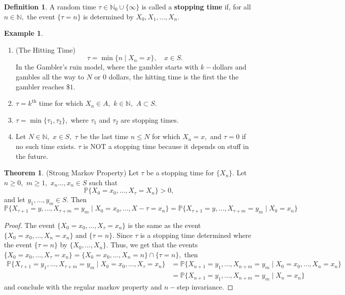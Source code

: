 \documentclass[10pt, oneside]{article}
\newcommand{\bbP}{\mathbb{P}}
\newcommand{\bbN}{\mathbb{N}}
\theoremstyle{definition}
\newtheorem{exmp}{Example}[section]
\newtheorem{thm}{Theorem}
\newtheorem{defn}{Definition}
\begin{document}
\begin{defn}
    A random time $\tau \in \bbN_0 \cup \{\infty\}$ is called a \textbf{stopping time} if, for all $n \in \bbN,$ the event $\{\tau = n\}$ is determined by $X_0, X_1, \dots, X_n.$ 
\end{defn}
\begin{exmp}
\begin{enumerate}
    \item (The Hitting Time) \[\tau = \min\{n \mid X_n = x\}, \quad x\in S.\]
    In the Gambler's ruin model, where the gambler starts with $k-$dollars and gambles all the way to $N$ or $0$ dollars, the hitting time is the first the the gambler reaches $\$1$.
    \item $\tau = k^\text{th}$ time for which $X_n \in A,$ $k\in \bbN,$ $A \subset S.$
    \item $\tau = \min\{\tau_1, \tau_2\},$ where $\tau_1$ and $\tau_2$ are stopping times. 
    \item Let $N \in \bbN,$ $x\in S,$ $\tau$ be the last time $n \leq N$ for which $X_n = x,$ and $\tau  = 0$ if no such time exists. $\tau$ is NOT a stopping time because it  depends on stuff in the future.
\end{enumerate}
\end{exmp}

\begin{thm}
    (Strong Markov Property) Let $\tau$ be a stopping time for $\{X_n\}.$ Let $n \geq 0,$ $m\geq 1,$ $x_n \dots, x_n \in S$ such that 
    \[\bbP\{X_0 = x_0, \dots, X_\tau = X_n\} >0,\] and 
    let $y_1, \dots, y_m \in S.$ Then 
    \[\bbP\{X_{\tau + 1} = y, \dots, X_{\tau + m} = y_m\mid X_0 = x_0, \dots, X-\tau = x_n\} =\bbP\{X_{\tau + 1} = y, \dots, X_{\tau + m} = y_m\mid X_0 = x_n\}\]
\end{thm}
\begin{proof}
    The event $\{X_0 = x_0, \dots, X_\tau = x_n\}$ is the same as the event $\{X_0 = x_0, \dots, X_n = x_n\}$ and $\{\tau = n\}.$ Since $\tau$ is a stopping time determined where the event $\{\tau = n\}$ by $\{X_0, \dots, X_n\}.$ Thus, we get that the events $\{X_0 = x_0, \dots, X_\tau = x_n\} = \{X_0 = x_0, \dots, X_n = n\}\cap \{\tau = n\},$ then 
    \begin{align*}
        \bbP\{X_{\tau + 1} = y_1, \dots, X_{\tau  + m} = y_m \mid X_0 = x_0, \dots, X_\tau = x_n\} &= \bbP\{X_{n + 1} = y_1, \dots, X_{n  + m} = y_m \mid X_0 = x_0, \dots, X_n = x_n\}\\
        &= \bbP\{X_{n + 1} = y_1, \dots, X_{n  + m} = y_m \mid X_n = x_n\}
    \end{align*} and conclude with the regular markov property and $n-$step invariance.
\end{proof}
\end{document}

